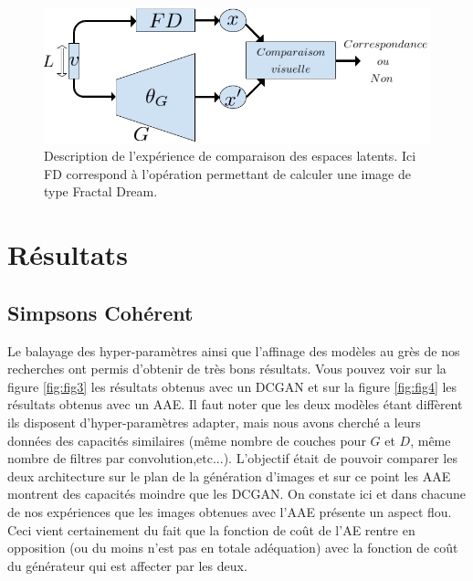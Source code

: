 \documentclass[11pt,francais]{article}
\begin{document}
\begin{figure}[!h]
    \centering
    \includegraphics[width=\textwidth]{Figures/CorrespondancesLS/CorrespondancesLS.png}
    \caption{Description de l'expérience de comparaison des espaces latents. Ici FD correspond à l'opération permettant de calculer une image de type Fractal Dream.}
    \label{fig:fig11}
\end{figure}


\section{Résultats}
\subsection{Simpsons Cohérent}
\label{sec:SimpsonsCoherent}

Le balayage des hyper-paramètres ainsi que l'affinage des modèles au grès de nos recherches ont permis d'obtenir de très bons résultats. Vous pouvez voir sur la figure \ref{fig:fig3} les résultats obtenus avec un DCGAN et sur la figure \ref{fig:fig4} les résultats obtenus avec un AAE. 
Il faut noter que les deux modèles étant diffèrent ils disposent d'hyper-paramètres adapter, mais nous avons cherché a leurs données des capacités similaires (même nombre de couches pour \(G\) et \(D\), même nombre de filtres par convolution,etc...). L'objectif était de pouvoir comparer les deux architecture sur le plan de la génération d'images et sur ce point les AAE montrent des capacités moindre que les DCGAN.
On constate ici et dans chacune de nos expériences que les images obtenues avec l'AAE présente un aspect flou. Ceci vient certainement du fait que la fonction de coût de l'AE rentre en opposition (ou du moins n'est pas en totale adéquation) avec la fonction de coût du générateur qui est affecter par les deux.
\end{document}
